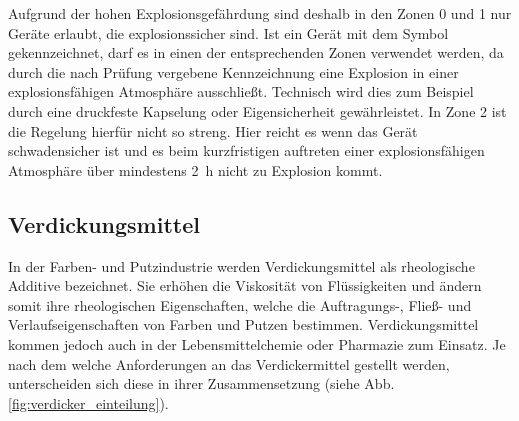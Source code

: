 Aufgrund der hohen Explosionsgefährdung sind deshalb in den Zonen 0 und 1 nur Geräte erlaubt, die explosionssicher sind. Ist ein Gerät mit dem Symbol\,\exsymbol\, gekennzeichnet, darf es in einen der entsprechenden Zonen verwendet werden, da durch die nach Prüfung vergebene Kennzeichnung eine Explosion in einer explosionsfähigen Atmosphäre ausschließt. Technisch wird dies zum Beispiel durch eine druckfeste Kapselung oder Eigensicherheit gewährleistet. In Zone 2 ist die Regelung hierfür nicht so streng. Hier reicht es wenn das Gerät schwadensicher ist und es beim kurzfristigen auftreten einer explosionsfähigen Atmosphäre über mindestens \SI{2}{\hour} nicht zu Explosion kommt. \cite{Ignatowitz.2015}


\subsection{Verdickungsmittel}

In der Farben- und Putzindustrie werden Verdickungsmittel als rheologische Additive bezeichnet. Sie erhöhen die Viskosität von Flüssigkeiten und ändern somit ihre rheologischen Eigenschaften, welche die Auftragungs-, Fließ- und Verlaufseigenschaften von Farben und Putzen bestimmen. Verdickungsmittel kommen jedoch auch in der Lebensmittelchemie oder Pharmazie zum Einsatz. Je nach dem welche Anforderungen an das Verdickermittel gestellt werden, unterscheiden sich diese in ihrer Zusammensetzung (siehe Abb. \ref{fig:verdicker_einteilung}). \cite{Brock.2009}


